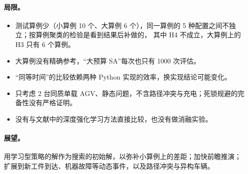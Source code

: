 \documentclass[11pt,a4paper]{ctexart}
\theoremstyle{definition}
\theoremstyle{remark}
\begin{document}
\paragraph{局限。}
\begin{itemize}[nosep]
  \item 测试算例少（小算例 10 个、大算例 6 个），同一算例的 5 种配置之间不独立；按算例聚类的检验是看到结果后补做的，
        其中 H4 不成立，大算例上的 H3 只有 6 个算例。
  \item 大算例没有精确参考，“大预算 SA”每次也只有 1000 次评估。
  \item “同等时间”的比较依赖两种 Python 实现的效率，换实现结论可能变化。
  \item 只考虑 2 台同质单载 AGV、静态问题，不含路径冲突与充电；死锁规避的完备性没有严格证明。
  \item 没有与文献中的深度强化学习方法直接比较，也没有做消融实验。
\end{itemize}

\paragraph{展望。}用学习型策略的解作为搜索的初始解，以弥补小算例上的差距；加快前瞻推演；
扩展到新工件到达、机器故障等动态事件，以及路径冲突与异构车辆。
\end{document}
